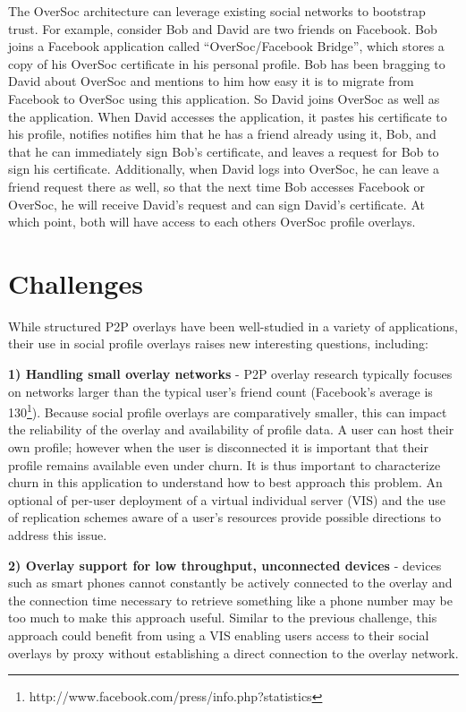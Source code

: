 The OverSoc architecture can leverage existing social networks to bootstrap
trust.  For example, consider Bob and David are two friends on Facebook.  Bob
joins a Facebook application called ``OverSoc/Facebook Bridge'', which stores
a copy of his OverSoc certificate in his personal profile.  Bob has been
bragging to David about OverSoc and mentions to him how easy it is to migrate
from Facebook to OverSoc using this application.  So David joins OverSoc as
well as the application.  When David accesses the application, it pastes his
certificate to his profile, notifies notifies him that he has a friend already
using it, Bob, and that he can immediately sign Bob's certificate, and leaves a
request for Bob to sign his certificate.  Additionally, when David logs into
OverSoc, he can leave a friend request there as well, so that the next time
Bob accesses Facebook or OverSoc, he will receive David's request and can sign
David's certificate.  At which point, both will have access to each others
OverSoc profile overlays.  

\section{Challenges}
\label{vpo:outstanding}

While structured P2P overlays have been well-studied in a variety of
applications, their use in social profile overlays raises new interesting
questions, including:

{\bf 1) Handling small overlay networks} - P2P overlay research typically
focuses on networks larger than the typical user's friend count (Facebook's
average is 130\footnote{http://www.facebook.com/press/info.php?statistics}).
Because social profile overlays are comparatively smaller, this can impact the
reliability of the overlay and availability of profile data.  A user can host
their own profile; however when the user is disconnected it is important that
their profile remains available even under churn. It is thus important to
characterize churn in this application to understand how to best approach this
problem. An optional of per-user deployment of a virtual individual server
(VIS) and the use of replication schemes aware of a user's resources provide
possible directions to address this issue.

{\bf 2) Overlay support for low throughput, unconnected devices} - devices such
as smart phones cannot constantly be actively connected to the overlay and the
connection time necessary to retrieve something like a phone number may be too
much to make this approach useful.  Similar to the previous challenge, this
approach could benefit from using a VIS enabling users access to their social
overlays by proxy without establishing a direct connection to the overlay
network.

